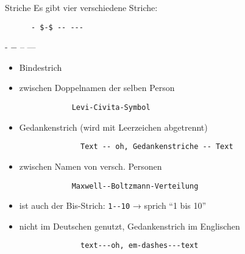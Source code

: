 \begin{frame}[fragile]{Striche}
  Es gibt vier verschiedene Striche:
  \begin{CodeExample}{0.49}
    \begin{lstlisting}
      - $-$ -- ---
    \end{lstlisting}
  \CodeResult
    \strut
    - $-$ -- ---
  \end{CodeExample}

  \begin{description}
    \item[- Bindestrich]
      \begin{itemize}
        \item Bindestrich
        \item zwischen Doppelnamen der selben Person
          \begin{lstlisting}
            Levi-Civita-Symbol
          \end{lstlisting}
      \end{itemize}
    \item[-- Halbgeviertstrich (en-dash)]
      \begin{itemize}
        \item Gedankenstrich (wird mit Leerzeichen abgetrennt)
          \begin{lstlisting}
              Text -- oh, Gedankenstriche -- Text
          \end{lstlisting}
          \smallskip
        \item zwischen Namen von versch. Personen
          \begin{lstlisting}
            Maxwell--Boltzmann-Verteilung
          \end{lstlisting}
          \smallskip
        \item ist auch der Bis-Strich:
          \lstinline+1--10+ → sprich \enquote{1 bis 10}
      \end{itemize}
    \item[--- Geviertstrich (em-dash)]
      \begin{itemize}
          \item nicht im Deutschen genutzt, Gedankenstrich im Englischen
            \begin{lstlisting}
              text---oh, em-dashes---text
            \end{lstlisting}
      \end{itemize}
  \end{description}
\end{frame}

